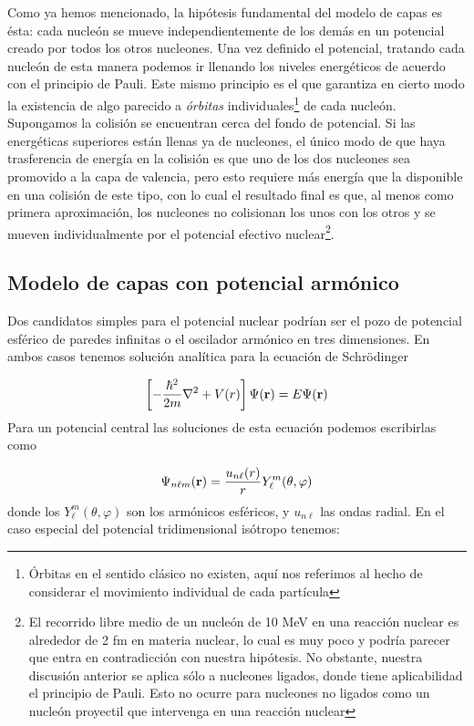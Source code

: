 Como ya hemos mencionado, la hipótesis fundamental del modelo de capas es ésta: cada nucleón se mueve independientemente de los demás en un potencial creado por todos los otros nucleones. Una vez definido el potencial, tratando cada nucleón de esta manera podemos ir llenando los niveles energéticos de acuerdo con el principio de Pauli. Este mismo principio es el que garantiza en cierto modo la existencia de algo parecido a \textit{órbitas} individuales\footnote{Órbitas en el sentido clásico no existen, aquí nos referimos al hecho de considerar el movimiento individual de cada partícula} de cada nucleón. Supongamos la colisión se encuentran cerca del fondo de potencial. Si las energéticas superiores están llenas ya de nucleones, el único modo de que haya trasferencia de energía en la colisión es que uno de los dos nucleones sea promovido a la capa de valencia, pero esto requiere más energía que la disponible en una colisión de este tipo, con lo cual el resultado final es que, al menos como primera aproximación, los nucleones no colisionan los unos con los otros y se mueven individualmente por el potencial efectivo nuclear\footnote{El recorrido libre medio de un nucleón de 10 MeV en una reacción nuclear es alrededor de 2 fm en materia nuclear, lo cual es muy poco y podría parecer que entra en contradicción con nuestra hipótesis. No obstante, nuestra discusión anterior se aplica sólo a nucleones ligados, donde tiene aplicabilidad el principio de Pauli. Esto no ocurre para nucleones no ligados como un nucleón proyectil que intervenga en una reacción nuclear}.

\subsection{Modelo de capas con potencial armónico}

Dos candidatos simples para el potencial nuclear podrían ser el pozo de potencial esférico de paredes infinitas o el oscilador armónico en tres dimensiones. En ambos casos tenemos solución analítica para la ecuación de Schrödinger

\begin{equation}
	\left[ -\frac{\hbar^2}{2m} \nabla^2 + V(r) \right] \Psi (\mathbf{r}) = E\Psi (\mathbf{r})
\end{equation}
Para un potencial central las soluciones de esta ecuación podemos escribirlas como

\begin{equation}
	\Psi_{n\ell m} (\mathbf{r}) = \frac{u_{n \ell} (r)}{r} Y_{\ell}^m (\theta,\varphi)
\end{equation}
donde los $Y_{\ell}^m (\theta,\varphi)$ son los armónicos esféricos, y $u_{n\ell}$ las ondas radial. En el caso especial del potencial tridimensional isótropo tenemos:

